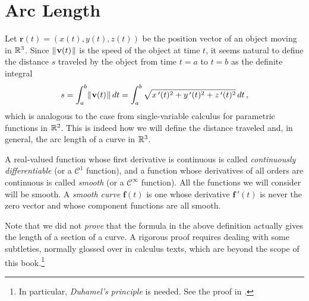 \section{Arc Length}
Let $\textbf{r}(t) = (x(t),y(t),z(t))$ be the position vector of an object moving in $\mathbb{R}^{3}$. Since
$\lVert\mspace{1mu}\textbf{v}(t)\mspace{1mu}\rVert$ is the speed of the object at time $t$, it seems natural to define the distance $s$
traveled by the object from time $t = a$ to $t = b$ as the definite integral
\begin{equation}\label{eqn:arclenspeed}
 s = \int_{a}^{b} \lVert\mspace{1mu}\textbf{v}(t)\mspace{1mu}\rVert\,dt = \int_{a}^{b} \sqrt{x\,'(t)^2 + y\,'(t)^2 + z\,'(t)^2} \, dt \, ,
\end{equation}
which is analogous to the case from single-variable calculus for parametric functions in $\mathbb{R}^{2}$. This is indeed how
we will define the distance traveled and, in general, the arc length of a curve in $\mathbb{R}^{3}$.


A real-valued function whose first derivative is continuous is called
\emph{continuously differentiable} (or a $\mathcal{C}^1$
function), and a function whose derivatives of all orders are continuous is called \emph{smooth} 
(or a $\mathcal{C}^{\infty}$ function). All the functions we will consider will be
smooth. A \emph{smooth curve} $\textbf{f}(t)$ is one whose derivative $\textbf{f}\,'(t)$ is never the zero vector and
whose component functions are all smooth.

Note that we did not \emph{prove} that the formula in the above definition actually gives the length of a
section of a curve. A rigorous proof requires dealing with some subtleties, normally glossed over in calculus texts,
which are beyond the scope of this book.\footnote{In particular, \emph{Duhamel's principle} is needed. See the proof in
\cite[\S\,14.2 and \S\,18.2]{tm}.}

